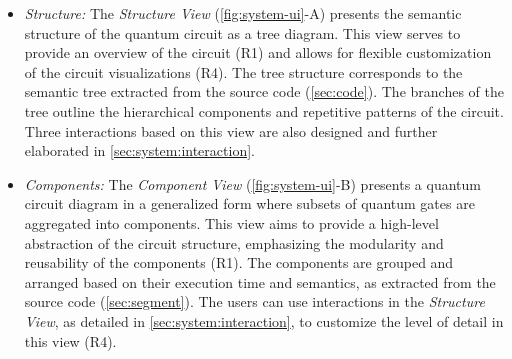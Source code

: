 \begin{itemize}[leftmargin=10pt, noitemsep]
  \item \emph{Structure:}
    The \emph{Structure View} (\cref{fig:system-ui}-A) presents the semantic structure of the quantum circuit as a tree diagram.
    This view serves to provide an overview of the circuit ({R1}) and allows for flexible customization of the circuit visualizations ({R4}). 
    The tree structure corresponds to the semantic tree extracted from the source code (\cref{sec:code}).
    The branches of the tree outline the hierarchical components and repetitive patterns of the circuit.
    Three interactions based on this view are also designed and further elaborated in \cref{sec:system:interaction}.

  \item \emph{Components:}
    The \emph{Component View} (\cref{fig:system-ui}-B) presents a quantum circuit diagram in a generalized form where subsets of quantum gates are aggregated into components.
    This view aims to provide a high-level abstraction of the circuit structure, emphasizing the modularity and reusability of the components ({R1}).
    The components are grouped and arranged based on their execution time and semantics, as extracted from the source code (\cref{sec:segment}).
    The users can use interactions in the \emph{Structure View}, as detailed in \cref{sec:system:interaction}, to customize the level of detail in this view ({R4}).


\end{itemize}
